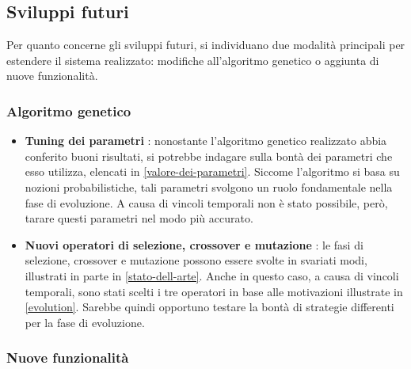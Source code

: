 \documentclass[a4paper,12pt]{article}
\begin{document}
\subsection{Sviluppi futuri}

Per quanto concerne gli sviluppi futuri, si individuano due modalità principali per estendere il sistema realizzato: modifiche all'algoritmo genetico o aggiunta di nuove funzionalità.

\subsubsection{Algoritmo genetico} 

\begin{itemize}
	\item \textbf{Tuning dei parametri} : nonostante l'algoritmo genetico realizzato abbia conferito buoni risultati, si potrebbe indagare sulla bontà dei parametri che esso utilizza, elencati in \autoref{valore-dei-parametri}. Siccome l'algoritmo si basa su nozioni probabilistiche, tali parametri svolgono un ruolo fondamentale nella fase di evoluzione. A causa di vincoli temporali non è stato possibile, però, tarare questi parametri nel modo più accurato.
	\item \textbf{Nuovi operatori di selezione, crossover e mutazione} : le fasi di selezione, crossover e mutazione possono essere svolte in svariati modi, illustrati in parte in \autoref{stato-dell-arte}. Anche in questo caso, a causa di vincoli temporali, sono stati scelti i tre operatori in base alle motivazioni illustrate in \autoref{evolution}. Sarebbe quindi opportuno testare la bontà di strategie differenti per la fase di evoluzione.
\end{itemize}
 

\subsubsection{Nuove funzionalità}
\end{document}
